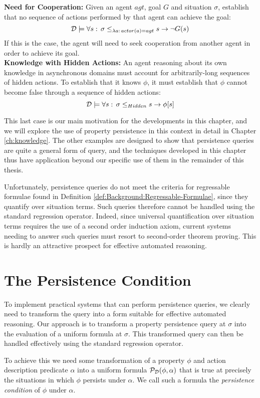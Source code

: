 \textbf{Need for Cooperation:} Given an agent $agt$, goal $G$ and
situation $\sigma$, establish that no sequence of actions performed
by that agent can achieve the goal:\[
\mathcal{D}\models\forall s:\,\sigma\leq_{\lambda a:\, actor(a)=agt}s\rightarrow\neg G(s)\]
 If this is the case, the agent will need to seek cooperation from
another agent in order to achieve its goal.\\


\textbf{Knowledge with Hidden Actions:} An agent reasoning about its
own knowledge in asynchronous domains must account for arbitrarily-long
sequences of hidden actions. To establish that it knows $\phi$, it
must establish that $\phi$ cannot become false through a sequence
of hidden actions:\[
\mathcal{D}\models\forall s:\,\sigma\leq_{Hidden}s\rightarrow\phi[s]\]


This last case is our main motivation for the developments in this
chapter, and we will explore the use of property persistence in this
context in detail in Chapter \ref{ch:knowledge}. The other examples
are designed to show that persistence queries are quite a general
form of query, and the techniques developed in this chapter thus have
application beyond our specific use of them in the remainder of this
thesis.

Unfortunately, persistence queries do not meet the criteria for regressable
formulae found in Definition \ref{def:Background:Regressable-Formulae},
since they quantify over situation terms. Such queries therefore cannot
be handled using the standard regression operator. Indeed, since universal
quantification over situation terms requires the use of a second order
induction axiom, current systems needing to answer such queries must
resort to second-order theorem proving. This is hardly an attractive
prospect for effective automated reasoning.


\section{The Persistence Condition\label{sec:Persistence:Condition}}

To implement practical systems that can perform persistence queries,
we clearly need to transform the query into a form suitable for effective
automated reasoning. Our approach is to transform a property persistence
query at $\sigma$ into the evaluation of a uniform formula at $\sigma$.
This transformed query can then be handled effectively using the standard
regression operator.

To achieve this we need some transformation of a property $\phi$
and action description predicate $\alpha$ into a uniform formula
$\mathcal{P}_{\mathcal{D}}(\phi,\alpha)$ that is true at precisely the situations
in which $\phi$ persists under $\alpha$. We call such a formula
the \emph{persistence condition} of $\phi$ under $\alpha$.

